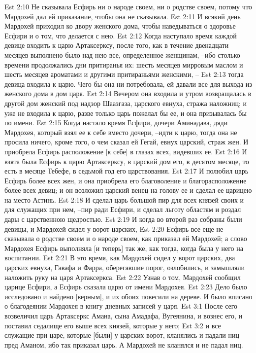 Est 2:10  Не сказывала Есфирь ни о народе своем, ни о родстве своем, потому что Мардохей дал ей приказание, чтобы она не сказывала.
Est 2:11  И всякий день Мардохей приходил ко двору женского дома, чтобы наведываться о здоровье Есфири и о том, что делается с нею.
Est 2:12  Когда наступало время каждой девице входить к царю Артаксерксу, после того, как в течение двенадцати месяцев выполнено было над нею все, определенное женщинам, --ибо столько времени продолжались дни притиранья их: шесть месяцев мирровым маслом и шесть месяцев ароматами и другими притираньями женскими, --
Est 2:13  тогда девица входила к царю. Чего бы она ни потребовала, ей давали все для выхода из женского дома в дом царя.
Est 2:14  Вечером она входила и утром возвращалась в другой дом женский под надзор Шаазгаза, царского евнуха, стража наложниц; и уже не входила к царю, разве только царь пожелал бы ее, и она призывалась бы по имени.
Est 2:15  Когда настало время Есфири, дочери Аминадава, дяди Мардохея, который взял ее к себе вместо дочери, --идти к царю, тогда она не просила ничего, кроме того, о чем сказал ей Гегай, евнух царский, страж жен. И приобрела Есфирь расположение [к себе] в глазах всех, видевших ее.
Est 2:16  И взята была Есфирь к царю Артаксерксу, в царский дом его, в десятом месяце, то есть в месяце Тебефе, в седьмой год его царствования.
Est 2:17  И полюбил царь Есфирь более всех жен, и она приобрела его благоволение и благорасположение более всех девиц; и он возложил царский венец на голову ее и сделал ее царицею на место Астинь.
Est 2:18  И сделал царь большой пир для всех князей своих и для служащих при нем, --пир ради Есфири, и сделал льготу областям и роздал дары с царственною щедростью.
Est 2:19  И когда во второй раз собраны были девицы, и Мардохей сидел у ворот царских,
Est 2:20  Есфирь все еще не сказывала о родстве своем и о народе своем, как приказал ей Мардохей; а слово Мардохея Есфирь выполняла [и теперь] так же, как тогда, когда была у него на воспитании.
Est 2:21  В это время, как Мардохей сидел у ворот царских, два царских евнуха, Гавафа и Фарра, оберегавшие порог, озлобились, и замышляли наложить руку на царя Артаксеркса.
Est 2:22  Узнав о том, Мардохей сообщил царице Есфири, а Есфирь сказала царю от имени Мардохея.
Est 2:23  Дело было исследовано и найдено [верным], и их обоих повесили на дереве. И было вписано о благодеянии Мардохея в книгу дневных записей у царя.
Est 3:1  После сего возвеличил царь Артаксеркс Амана, сына Амадафа, Вугеянина, и вознес его, и поставил седалище его выше всех князей, которые у него;
Est 3:2  и все служащие при царе, которые [были] у царских ворот, кланялись и падали ниц пред Аманом, ибо так приказал царь. А Мардохей не кланялся и не падал ниц.
